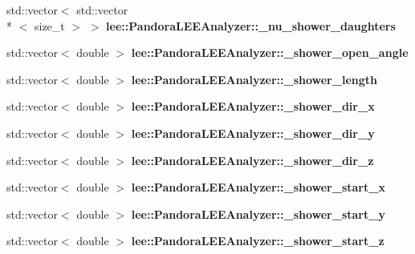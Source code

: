 \begin{DoxyCompactItemize}
\item 
\hypertarget{group__lee_ga4d78972623fa65077421a091e226f61f}{std\-::vector$<$ std\-::vector\\*
$<$ size\-\_\-t $>$ $>$ {\bfseries lee\-::\-Pandora\-L\-E\-E\-Analyzer\-::\-\_\-nu\-\_\-shower\-\_\-daughters}}\label{group__lee_ga4d78972623fa65077421a091e226f61f}

\item 
\hypertarget{group__lee_ga9e637e1f18334830d94136b89c4d0138}{std\-::vector$<$ double $>$ {\bfseries lee\-::\-Pandora\-L\-E\-E\-Analyzer\-::\-\_\-shower\-\_\-open\-\_\-angle}}\label{group__lee_ga9e637e1f18334830d94136b89c4d0138}

\item 
\hypertarget{group__lee_ga88255d9d3a3a401c834d624076c30d5b}{std\-::vector$<$ double $>$ {\bfseries lee\-::\-Pandora\-L\-E\-E\-Analyzer\-::\-\_\-shower\-\_\-length}}\label{group__lee_ga88255d9d3a3a401c834d624076c30d5b}

\item 
\hypertarget{group__lee_gaac6afc45d77fbbfb38addc97038e1893}{std\-::vector$<$ double $>$ {\bfseries lee\-::\-Pandora\-L\-E\-E\-Analyzer\-::\-\_\-shower\-\_\-dir\-\_\-x}}\label{group__lee_gaac6afc45d77fbbfb38addc97038e1893}

\item 
\hypertarget{group__lee_gaa08672578dd6c1729649fa54a1725401}{std\-::vector$<$ double $>$ {\bfseries lee\-::\-Pandora\-L\-E\-E\-Analyzer\-::\-\_\-shower\-\_\-dir\-\_\-y}}\label{group__lee_gaa08672578dd6c1729649fa54a1725401}

\item 
\hypertarget{group__lee_gaee2bf39916f97db6bee077df4020662f}{std\-::vector$<$ double $>$ {\bfseries lee\-::\-Pandora\-L\-E\-E\-Analyzer\-::\-\_\-shower\-\_\-dir\-\_\-z}}\label{group__lee_gaee2bf39916f97db6bee077df4020662f}

\item 
\hypertarget{group__lee_ga8d3d2b24d81dc924d1f972bf3748dd76}{std\-::vector$<$ double $>$ {\bfseries lee\-::\-Pandora\-L\-E\-E\-Analyzer\-::\-\_\-shower\-\_\-start\-\_\-x}}\label{group__lee_ga8d3d2b24d81dc924d1f972bf3748dd76}

\item 
\hypertarget{group__lee_gae12d2a6c7e2d78fc9d7e6f30ce959fa7}{std\-::vector$<$ double $>$ {\bfseries lee\-::\-Pandora\-L\-E\-E\-Analyzer\-::\-\_\-shower\-\_\-start\-\_\-y}}\label{group__lee_gae12d2a6c7e2d78fc9d7e6f30ce959fa7}

\item 
\hypertarget{group__lee_gafef1c0810411173778fa2ea099cbb03f}{std\-::vector$<$ double $>$ {\bfseries lee\-::\-Pandora\-L\-E\-E\-Analyzer\-::\-\_\-shower\-\_\-start\-\_\-z}}\label{group__lee_gafef1c0810411173778fa2ea099cbb03f}


\end{DoxyCompactItemize}
